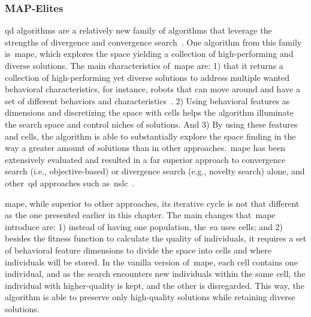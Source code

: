 \subsubsection{MAP-Elites} \label{sec:map-elites}

\acrlong{qd} algorithms are a relatively new family of algorithms that leverage the strengths of divergence and convergence search~\cite{pugh_quality_2016}. One algorithm from this family is~\acrshort{mape}, which explores the space yielding a collection of high-performing and diverse solutions. The main characteristics of~\acrshort{mape} are: 1) that it returns a collection of high-performing yet diverse solutions to address multiple wanted behavioral characteristics, for instance, robots that can move around and have a set of different behaviors and characteristics~\cite{cully_robots_2015}. 2) Using behavioral features as dimensions and discretizing the space with cells helps the algorithm illuminate the search space and control niches of solutions. And 3) By using these features and cells, the algorithm is able to substantially explore the space finding in the way a greater amount of solutions than in other approaches.~\acrshort{mape} has been extensively evaluated and resulted in a far superior approach to convergence search (i.e., objective-based) or divergence search (e.g., novelty search) alone, and other~\acrshort{qd} approaches such as~\acrshort{nslc}~\cite{mouret_illuminating_2015}. 

\acrshort{mape}, while superior to other approaches, its iterative cycle is not that different as the one presented earlier in this chapter. The main changes that~\acrshort{mape} introduce are: 1) instead of having one population, the~\acrshort{ea} uses cells; and 2) besides the fitness function to calculate the quality of individuals, it requires a set of behavioral feature dimensions to divide the space into cells and where individuals will be stored. In the vanilla version of~\acrshort{mape}, each cell contains one individual, and as the search encounters new individuals within the same cell, the individual with higher-quality is kept, and the other is disregarded. This way, the algorithm is able to preserve only high-quality solutions while retaining diverse solutions. 

